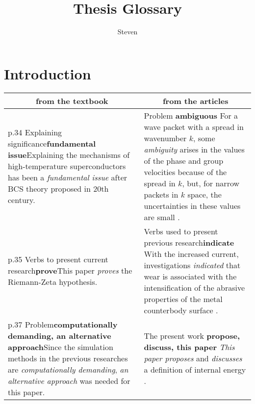 \documentclass[12pt]{article}
\title{Thesis Glossary}
\author{Steven}
\begin{document}
	\maketitle
\section{Introduction}
	\begin{longtable}{|p{}|p{}|}
	\hline
	\multicolumn{1}{|c|}{from the textbook}&\multicolumn{1}{c|}{from the articles}\\
	\hline
	\ding{172} p.34 Explaining significance\newline \textbf{fundamental issue}\newline Explaining the mechanisms of high-temperature superconductors has been a \emph{fundamental issue} after BCS theory proposed in 20th century.& \ding{174} Problem \newline \textbf{ambiguous} \newline For a wave packet with a spread in wavenumber $k$, some \emph{ambiguity} arises in the values of the phase and group velocities because of the spread in $k$, but, for narrow packets in $k$ space, the uncertainties in these values are small \cite{intro1}. \\
	\hline
	\ding{173} p.35 Verbs to present current research\newline \textbf{prove}\newline This paper \emph{proves} the Riemann-Zeta hypothesis. & \ding{173} Verbs used to present previous research\newline \textbf{indicate} \newline With the increased current, investigations \emph{indicated} that wear is associated with the intensification of the abrasive properties of the metal counterbody surface \cite{intro2}.\\
	\hline
	\ding{174} p.37 Problem\newline \textbf{computationally demanding, an alternative approach}\newline Since the simulation methods in the previous researches are \emph{computationally demanding}, \emph{an alternative approach} was needed for this paper.& \ding{175} The present work \newline \textbf{propose, discuss, this paper} \newline \emph{This paper proposes} and \emph{discusses} a definition of internal energy \cite{intro3}.\\
	\hline
	\end{longtable}
\end{document}
